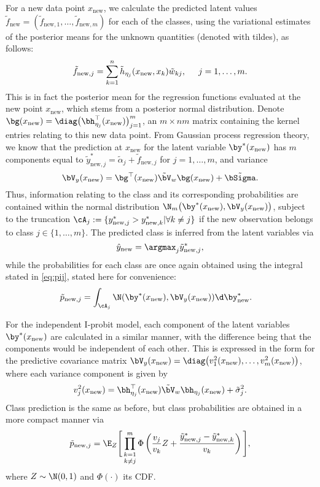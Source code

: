 For a new data point $x_{\text{new}}$, we calculate the predicted latent values $\tilde f_{\text{new}} = (\tilde f_{\text{new},1}, \dots, \tilde f_{\text{new},m})$ for each of the classes, using the variational estimates of the posterior means for the unknown quantities (denoted with tildes), as follows:
\[
  \tilde f_{\text{new},j} = \sum_{k=1}^n \tilde h_{\eta_j}(x_{\text{new}},x_k) \tilde w_{kj}, \hspace{0.5cm} j = 1,\dots,m.
\]
This is in fact the posterior mean for the regression functions evaluated at the new point $x_{\text{new}}$, which stems from a posterior normal distribution.
Denote $\bg(x_{\text{new}}) = \diag\big(\bh_{\eta_j}^\top(x_{\text{new}})\big)_{j=1}^m$, an $m \times nm$ matrix containing the kernel entries relating to this new data point.
From Gaussian process regression theory, we know that the prediction at $x_{\text{new}}$ for the latent variable $\by^*(x_{\text{new}})$ has $m$ components equal to $\tilde y_{\text{new},j}^* = \tilde\alpha_j + \tilde f_{\text{new},j}$ for $j=1,\dots,m$, and variance 
\[
  \bV_y(x_{\text{new}}) = \bg^\top(x_{\text{new}}) \tilde\bV_w \bg(x_{\text{new}}) + \tilde\bSigma.
\]
Thus, information relating to the class and its corresponding probabilities are contained within the normal distribution $\N_{m}\big(\by^*(x_{\text{new}}), \bV_y(x_{\text{new}}) \big)$, subject to the truncation $\cA_j := \{ y_{\text{new},j}^* > y_{\text{new},k}^* | \forall k \neq j\}$ if the new observation belongs to class $j \in \{1,\dots, m\}$.
The predicted class is inferred from the latent variables via
\[
  \hat y_{\text{new}} = \argmax_j \tilde y_{\text{new},j}^*, 
\]
while the probabilities for each class are once again obtained using the integral stated in \eqref{eq:pij}, stated here for convenience:
\begin{align*}
  \tilde p_{\text{new},j} 
  &= \int_{\cA_j} \N(\by^*(x_{\text{new}}), \bV_y(x_{\text{new}})) \d\by^*_{\text{new}}.
\end{align*}

For the independent I-probit model, each component of the latent variables $\by^*(x_{\text{new}})$ are calculated in a similar manner, with the difference being that the components would be independent of each other.
This is expressed in the form for the predictive covariance matrix $\bV_y(x_{\text{new}}) = \diag \big( v_1^2(x_{\text{new}}),\dots, v_m^2(x_{\text{new}})\big)$, where each variance component is given by
\[
  v_j^2(x_{\text{new}}) = \bh_{\eta_j}^\top(x_{\text{new}}) \tilde\bV_w \bh_{\eta_j}(x_{\text{new}}) + \tilde\sigma_{j}^2.
\]
Class prediction is the same as before, but class probabilities are obtained in a more compact manner via
\[
  \tilde p_{\text{new},j} 
  = \E_Z \Bigg[ \mathop{\prod_{k=1}^m}_{k\neq j} 
  \Phi \left(\frac{v_j}{v_k} Z + \frac{\tilde y_{\text{new},j}^* - \tilde y_{\text{new},k}^*}{v_k} \right) \Bigg],
\]
where $Z\sim\N(0,1)$ and $\Phi(\cdot)$ its CDF.

